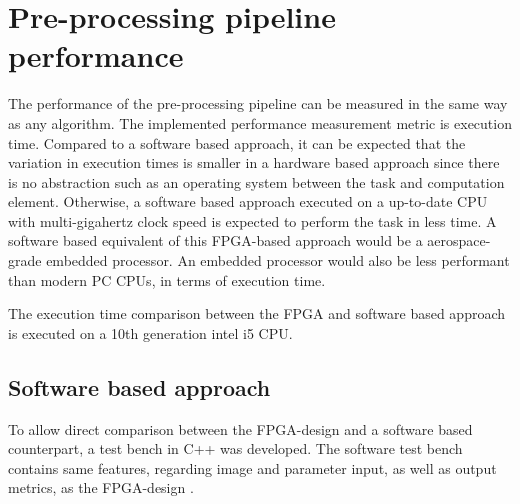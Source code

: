 \documentclass[12pt]{report}
\begin{document}


\section{Pre-processing pipeline performance}
The performance of the pre-processing pipeline can be measured in the same way as any algorithm. The implemented performance measurement metric is execution time. Compared to a software based approach, it can be expected that the variation in execution times is smaller in a hardware based approach since there is no abstraction such as an operating system between the task and computation element. Otherwise, a software based approach executed on a up-to-date CPU with multi-gigahertz clock speed is expected to perform the task in less time. A software based equivalent of this FPGA-based approach would be a aerospace-grade embedded processor. An embedded processor would also be less performant than modern PC CPUs, in terms of execution time.
\par
The execution time comparison between the FPGA and software based approach is executed on a 10th generation intel i5 CPU. 

\subsection{Software based approach}
To allow direct comparison between the FPGA-design and a software based counterpart, a test bench in C++ was developed. The software test bench contains same features, regarding image and parameter input, as well as output metrics, as the FPGA-design \citep{cppImgProc}.
\end{document}
